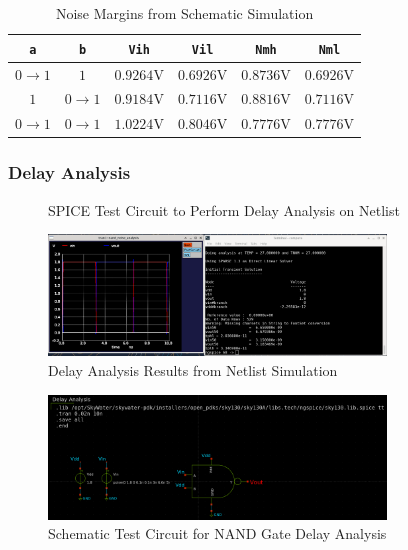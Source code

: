 \documentclass{article}
\begin{document}
	\begin{table}[H]
	\begin{center}
	\caption{Noise Margins from Schematic Simulation}
	\label{table::nand_gate_noise_analysis_schem}
	\begin{tabular}{| c | c | c | c | c | c |}
		\hline
		\texttt{a} & \texttt{b} & \texttt{Vih} & \texttt{Vil} & \texttt{Nmh} & \texttt{Nml} \\
		\hline	
		$0 \rightarrow 1$ & $1$ & $0.9264 \text{V}$ & $0.6926 \text{V}$ & $0.8736 \text{V}$ & $0.6926 \text{V}$\\
		\hline	
		$1$ & $0 \rightarrow 1$ & $0.9184 \text{V}$ & $0.7116 \text{V}$ & $0.8816 \text{V}$ & $0.7116 \text{V}$\\
		\hline	
		$0 \rightarrow 1$ & $0 \rightarrow 1$ & $1.0224 \text{V}$ & $0.8046 \text{V}$ & $0.7776 \text{V}$ & $0.7776 \text{V}$\\
		\hline
	\end{tabular}
	\end{center}
	\end{table}
	
	\subsubsection{Delay Analysis}
	\begin{figure}[H]
		
		\caption{SPICE Test Circuit to Perform Delay Analysis on Netlist}
		\label{fig::nand_delay_analysis_test_circuit}
	\end{figure}
	
	\begin{figure}[H]
		\centerline{\includegraphics[width=0.8\textwidth]{nand_delay_analysis.png}}
		\caption{Delay Analysis Results from Netlist Simulation}
		\label{fig::nand_delay_analysis}
	\end{figure}
	
	\begin{figure}[H]
		\centerline{\includegraphics[width=0.8\textwidth]{nand_delay_analysis_test_circuit.png}}
		\caption{Schematic Test Circuit for NAND Gate Delay Analysis}
		\label{fig::nand_delay_analysis_test_circuit_schem}
	\end{figure}
	
\end{document}
